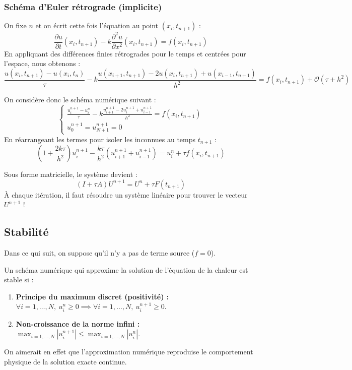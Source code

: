 \subsubsection{Schéma d'Euler rétrograde (implicite)}

On fixe $n$ et on écrit cette fois l'équation au point $(x_i, t_{n+1})$ :
\[
    \frac{\partial u}{\partial t}(x_i, t_{n+1}) - k \frac{\partial^2 u}{\partial x^2}(x_i, t_{n+1}) = f(x_i, t_{n+1})
\]
En appliquant des différences finies rétrogrades pour le temps et centrées pour l'espace, nous obtenons :
\[
    \frac{u(x_i, t_{n+1}) - u(x_i, t_n)}{\tau} - k \frac{u(x_{i+1}, t_{n+1}) - 2u(x_i, t_{n+1}) + u(x_{i-1}, t_{n+1})}{h^2} = f(x_i, t_{n+1}) + \mathcal{O}(\tau + h^2)
\]

\begin{algorithme}
On considère donc le schéma numérique suivant :
\begin{equation}
\begin{cases}
    \frac{u_i^{n+1} - u_i^n}{\tau} - k \frac{u_{i+1}^{n+1} - 2u_i^{n+1} + u_{i-1}^{n+1}}{h^2} = f(x_i, t_{n+1}) \\
    u_0^{n+1} = u_{N+1}^{n+1} = 0
\end{cases}
\end{equation}
En réarrangeant les termes pour isoler les inconnues au temps $t_{n+1}$ :
\[
    \left( 1 + \frac{2k\tau}{h^2} \right) u_i^{n+1} - \frac{k\tau}{h^2} \left( u_{i+1}^{n+1} + u_{i-1}^{n+1} \right) = u_i^n + \tau f(x_i, t_{n+1})
\]
\end{algorithme}

Sous forme matricielle, le système devient :
\[
    (I + \tau A) U^{n+1} = U^n + \tau F(t_{n+1})
\]
À chaque itération, il faut résoudre un système linéaire pour trouver le vecteur $U^{n+1}$ !

\subsection{Stabilité}

Dans ce qui suit, on suppose qu'il n'y a pas de terme source ($f=0$).

\begin{definition}
Un schéma numérique qui approxime la solution de l'équation de la chaleur est stable si :
\begin{enumerate}
    \item \textbf{Principe du maximum discret (positivité) :} $\forall i=1,\dots,N, \ u_i^n \ge 0 \implies \forall i=1,\dots,N, \ u_i^{n+1} \ge 0$.
    \item \textbf{Non-croissance de la norme infini :} $\max_{i=1,\dots,N} |u_i^{n+1}| \le \max_{i=1,\dots,N} |u_i^n|$.
\end{enumerate}
On aimerait en effet que l'approximation numérique reproduise le comportement physique de la solution exacte continue.
\end{definition}


